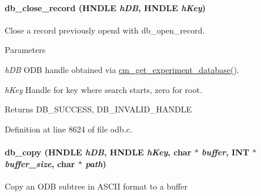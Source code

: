 \paragraph[{db\_\-close\_\-record}]{ db\_\-close\_\-record (HNDLE {\em hDB}, \/  HNDLE {\em hKey})}\hfill\label{group__odbfunctionc_gaa621351e007f68f6298b8edf5bd652c4}
Close a record previously opend with db\_\-open\_\-record. 
\begin{DoxyParams}{Parameters}
\item[{\em hDB}]ODB handle obtained via \hyperlink{group__cmfunctionc_ga16b33b70783a3f5ba98b4094149d12b7}{cm\_\-get\_\-experiment\_\-database()}. \item[{\em hKey}]Handle for key where search starts, zero for root. \end{DoxyParams}
\begin{DoxyReturn}{Returns}
DB\_\-SUCCESS, DB\_\-INVALID\_\-HANDLE 
\end{DoxyReturn}


Definition at line 8624 of file odb.c.
\paragraph[{db\_\-copy}]{ db\_\-copy (HNDLE {\em hDB}, \/  HNDLE {\em hKey}, \/  char $\ast$ {\em buffer}, \/  {\bf INT} $\ast$ {\em buffer\_\-size}, \/  char $\ast$ {\em path})}\hfill\label{group__odbfunctionc_ga165f2428c082852ff2ac1e8c4c78d607}
Copy an ODB subtree in ASCII format to a buffer

